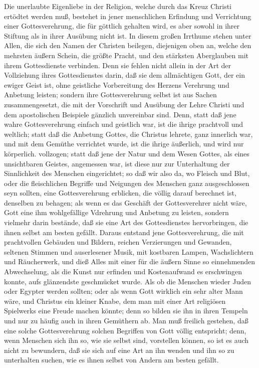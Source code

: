 Die unerlaubte Eigenliebe in der Religion, welche durch das Kreuz Christi ertödtet werden muß, bestehet in jener menschlichen Erfindung und Verrichtung einer Gottesverehrung, die für göttlich gehalten wird, es aber sowohl in ihrer Stiftung als in ihrer Ausübung nicht ist. In diesem großen Irrthume stehen unter Allen, die sich den Namen der Christen beilegen, diejenigen oben an, welche den mehrsten äußern Schein, die größte Pracht, und den stärksten Aberglauben mit ihrem Gottesdienste verbinden. Denn sie fehlen nicht allein in der Art der Vollziehung ihres Gottesdienstes darin, daß sie dem allmächtigen Gott, der ein ewiger Geist ist, ohne geistliche Vorbereitung des Herzens Verehrung und Anbetung leisten; sondern ihre Gottesverehrung selbst ist aus Sachen zusammengesetzt, die mit der Vorschrift und Ausübung der Lehre Christi und dem apostolischen Beispiele gänzlich unvereinbar sind. Denn, statt daß jene wahre Gottesverehrung einfach und geistlich war, ist die ihrige prachtvoll und weltlich; statt daß die Anbetung Gottes, die Christus lehrete, ganz innerlich war, und mit dem Gemüthe verrichtet wurde, ist die ihrige äußerlich, und wird nur körperlich. vollzogen; statt daß jene der Natur und dem Wesen Gottes, als eines unsichtbaren Geistes, angemessen war, ist diese nur zur Unterhaltung der Sinnlichkeit des Menschen eingerichtet; so daß wir also da, wo Fleisch und Blut, oder die fleischlichen Begriffe und Neigungen des Menschen ganz ausgeschlossen seyn sollten, eine Gottesverehrung erblicken, die völlig darauf berechnet ist, denselben zu behagen; als wenn es das Geschäft der Gottesverehrer nicht wäre, Gott eine ihm wohlgefällige Vdrehrung und Anbetung zu leisten, sondern vielmehr darin bestände, daß sie eine Art des Gottesdienstes hervorbringen, die ihnen selbst am besten gefällt. Daraus entstand jene Gottesverehrung, die mit prachtvollen Gebäuden und Bildern, reichen Verzierungen und Gewanden, seltenen Stimmen und auserlesener Musik, mit kostbaren Lampen, Wachslichtern und Räucherwerk, und dieß Alles mit einer für die äußern Sinne so einnehmenden Abwechselung, als die Kunst nur erfinden und Kostenaufwand es erschwingen konnte, aufs glänzendste geschmücket wurde. Als ob die Menschen wieder Juden oder Egypter werden sollten; oder als wenn Gott wirklich ein sehr alter Mann wäre, und Christus ein kleiner Knabe, dem man mit einer Art religiösen Spielwerks eine Freude machen könnte; denn so bilden sie ihn in ihren Tempeln und nur zu häufig auch in ihren Gemüthern ab. Man muß freilich gestehen, daß eine solche Gottesverehrung solchen Begriffen von Gott völlig entspricht; denn, wenn Menschen sich ihn so, wie sie selbst sind, vorstellen können, so ist es auch nicht zu  bewundern, daß sie sich auf eine Art an ihn wenden und ihn so zu unterhalten suchen, wie es ihnen selbst von Andern am besten gefällt.

